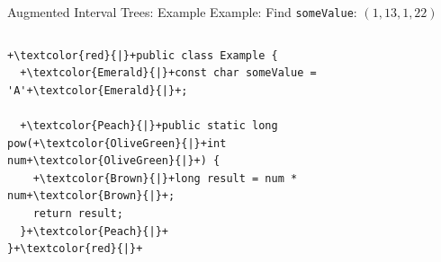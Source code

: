 \documentclass[xcolor={dvipsnames},aspectratio=169,compress,final]{beamer}
\begin{document}
\begin{frame}[fragile]{Augmented Interval Trees: Example}
	Example: Find \texttt{someValue}: $(1, 13, 1, 22)$
	\begin{columns}
		\begin{verbatim}
+\textcolor{red}{|}+public class Example {
  +\textcolor{Emerald}{|}+const char someValue = 'A'+\textcolor{Emerald}{|}+;

  +\textcolor{Peach}{|}+public static long pow(+\textcolor{OliveGreen}{|}+int num+\textcolor{OliveGreen}{|}+) {
    +\textcolor{Brown}{|}+long result = num * num+\textcolor{Brown}{|}+;
    return result;
  }+\textcolor{Peach}{|}+
}+\textcolor{red}{|}+
    \end{verbatim}

		\begin{figure}
			\begin{center}
			\end{center}
		\end{figure}
	\end{columns}
\end{frame}
\end{document}
